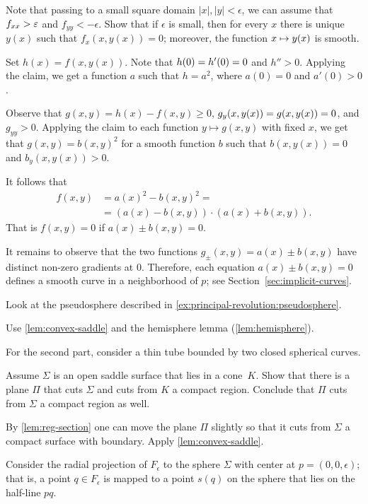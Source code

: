 Note that passing to a small square domain $|x|,|y|<\epsilon$, we can assume that $f_{xx}\z>\epsilon$ and $f_{yy}<-\epsilon$. 
Show that if $\epsilon$ is small, then for every $x$ there is unique $y(x)$ such that $f_x(x,y(x))=0$; 
moreover, the function $x\z\mapsto y(x)$ is smooth.

Set $h(x)=f(x,y(x))$.
Note that $h(0)\z=h'(0)=0$ and $h''>0$.
Applying the claim, we get a function $a$ such that $h=a^2$, where $a(0)=0$ and $a'(0)>0$.

Observe that $g(x,y)=h(x)-f(x,y)\ge 0$, $g_y(x,y(x))\z=g(x,y(x))\z=0$, and $g_{yy}>0$.
Applying the claim to each function $y\mapsto g(x,y)$ with fixed $x$, we get that $g(x,y)=b(x,y)^2$ for a smooth function $b$ such that 
$b(x,y(x))=0$ and $b_y(x,y(x))>0$.

It follows that 
\begin{align*}
f(x,y)&=a(x)^2-b(x,y)^2=
\\
&=
(a(x)-b(x,y))\cdot (a(x)+b(x,y)).
\end{align*}
That is $f(x,y)=0$ if $a(x)\pm b(x,y) =0$.

It remains to observe that the two functions $g_\pm(x,y)=a(x)\pm b(x,y)$ have distinct non-zero gradients at $0$.
Therefore, each equation $a(x)\pm b(x,y) =0$ defines a smooth curve in a neighborhood of $p$;
see Section~\ref{sec:implicit-curves}.

 Look at the pseudosphere described in \ref{ex:principal-revolution:pseudosphere}.

Use \ref{lem:convex-saddle} and the hemisphere lemma (\ref{lem:hemisphere}).

For the second part, consider a thin tube bounded by two closed spherical curves.

Assume $\Sigma$ is an open saddle surface that lies in a cone~$K$.
Show that there is a plane $\Pi$ that cuts $\Sigma$ and cuts from $K$ a compact region.
Conclude that $\Pi$ cuts from $\Sigma$ a compact region as well. 

By \ref{lem:reg-section} one can move the plane $\Pi$ slightly so that it cuts from $\Sigma$ a compact surface with boundary.
Apply \ref{lem:convex-saddle}.


Consider the radial projection of $F_\epsilon$ to the sphere $\Sigma$ with center at $p=(0,0,\epsilon)$;
that is, a point $q\in F_\epsilon$ is mapped to a point $s(q)$ on the sphere that lies on the half-line $pq$.

